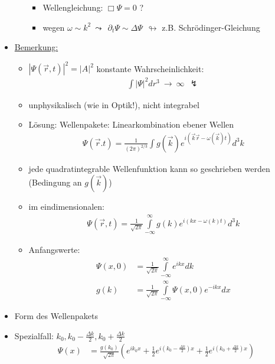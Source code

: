 \begin{itemize}
\begin{enumerate}[start=0]
\begin{itemize}
							\item Wellengleichung: $\Box\Psi=0$ ?
							\item wegen $\omega \sim k^2~\leadsto~~\partial_t\Psi\sim\Delta\Psi~~\looparrowright$ z.B. Schrödinger-Gleichung
							\end{itemize} 
                            \end{enumerate}						
                            \item \underline{Bemerkung:}
                            \begin{itemize}
                   			\item $|\Psi(\vec{r},t)|^2=|A|^2$ konstante Wahrscheinlichkeit:
                   					\begin{align*}
               				 		\int |\Psi|^2dr^3~\rightarrow~\infty ~~\lightning   
									\end{align*}        
							\item unphysikalisch (wie in Optik!), nicht integrabel
							\item Lösung: Wellenpakete: Linearkombination ebener Wellen
									\begin{align*}
									\Psi(\vec{r}.t)=\frac{1}{(2\pi)^{2/3}} \int g(\vec{k})e^{i(\vec{k}\vec{r}-\omega(\vec{k})t)}d^3k
									\end{align*}
							\item jede quadratintegrable Wellenfunktion kann so geschrieben werden (Bedingung an $g(\vec{k})$)
							\item im eindimensionalen:
									\begin{align*}
									\Psi(\vec{r},t)=\frac{1}{\sqrt{2\pi}}\int\limits_{-\infty}^{\infty}g(k)e^{i(kx-\omega(k)t)}d^3k
									\end{align*}                
							\item Anfangswerte:
									\begin{align*}
									\Psi(x, 0)&=\frac{1}{\sqrt{2\pi}}\int\limits_{-\infty}^{\infty}e^{ikx}dk\\
g(k)&=\frac{1}{\sqrt{2\pi}}\int\limits_{-\infty}^{\infty}\Psi(x,0)e^{-ikx}dx
									\end{align*}
							\end{itemize}                            						 
					\item Form des Wellenpakets
					\item Spezialfall: $k_0, k_0-\frac{\Delta k}{2}, k_0+\frac{\Delta k}{2}$
							\begin{align*}
							\Psi(x)&=\frac{g(k_0)}{\sqrt{2\pi}}\left(e^{ik_0x}+\frac{1}{2}e^{i(k_0-\frac{\Delta k}{2})x}+\frac{1}{2}e^{i(k_0+\frac{\Delta k}{2})x}\right)\\

\end{align*}
\end{itemize}
